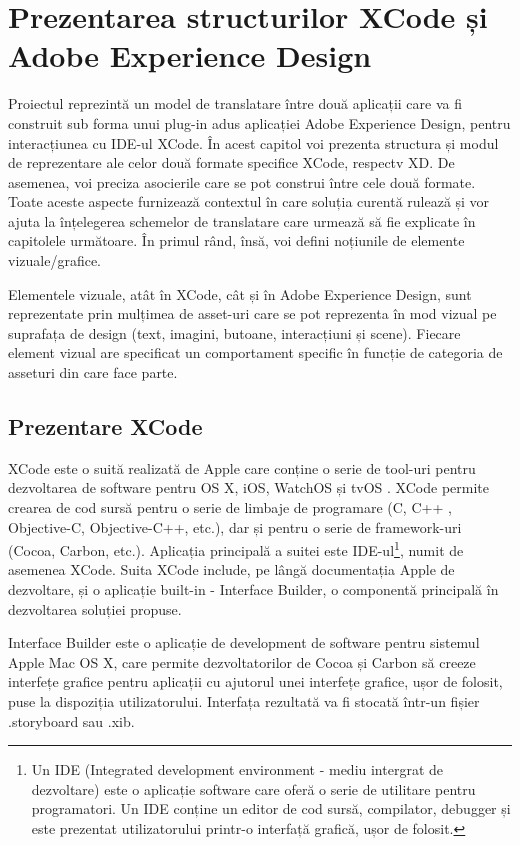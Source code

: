 \chapter{Prezentarea structurilor XCode și Adobe Experience Design}


Proiectul reprezintă un model de translatare între două aplicații care va fi construit sub forma unui plug-in adus aplicației Adobe Experience Design, pentru interacțiunea cu IDE-ul XCode. 
În acest capitol voi prezenta structura și modul de reprezentare ale celor două formate specifice XCode, respectv XD. De asemenea, voi preciza asocierile care se pot construi între cele două formate. Toate aceste aspecte furnizează contextul în care soluția curentă rulează și vor ajuta la înțelegerea schemelor de translatare care urmează să fie explicate în capitolele următoare. În primul rând, însă, voi defini noțiunile de elemente vizuale/grafice.

Elementele vizuale, atât în XCode, cât și în Adobe Experience Design, sunt reprezentate prin mulțimea de asset-uri care se pot reprezenta în mod vizual pe suprafața de design (text, imagini, butoane, interacțiuni și scene). Fiecare element vizual are specificat un comportament specific în funcție de categoria de asseturi din care face parte.


\section{Prezentare XCode}

XCode este o suită realizată de Apple care conține o serie de tool-uri pentru dezvoltarea de software pentru OS X, iOS, WatchOS și tvOS \cite{xcode}. XCode permite crearea de cod sursă pentru o serie de limbaje de programare (C, C++ , Objective-C, Objective-C++, etc.), dar și pentru o serie de framework-uri (Cocoa, Carbon, etc.). Aplicația principală a suitei este IDE-ul\footnote{Un IDE (Integrated development environment - mediu intergrat de dezvoltare) este o aplicație software care oferă o serie de utilitare pentru programatori. Un IDE conține un editor de cod sursă, compilator, debugger și este prezentat utilizatorului printr-o interfață grafică, ușor de folosit.}, numit de asemenea XCode. Suita XCode include, pe lângă documentația Apple de dezvoltare, și o aplicație built-in - Interface Builder, o componentă principală în dezvoltarea soluției propuse.

Interface Builder este o aplicație de development de software pentru sistemul Apple Mac OS X, care permite dezvoltatorilor de Cocoa și Carbon să creeze interfețe grafice pentru aplicații cu ajutorul unei interfețe grafice, ușor de folosit, puse la dispoziția utilizatorului. Interfața rezultată va fi stocată într-un fișier .storyboard sau .xib.

